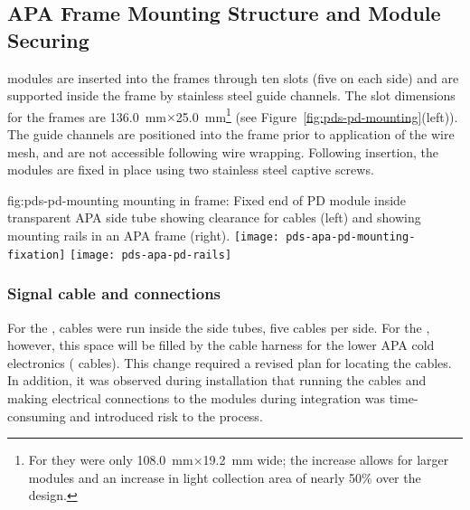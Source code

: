 \subsection{APA Frame Mounting Structure and Module Securing}	
\label{sec:fdsp-pd-assy-frames}

 modules are inserted into the  frames through ten slots (five on each side) and are supported inside the frame by stainless steel guide channels.  The slot dimensions for the   frames 
are \SI{136.0}{mm}$\times$\SI{25.0}{mm}\footnote{For  they were only \SI{108.0}{mm}$\times$\SI{19.2}{mm} wide; the increase allows for larger  modules and an increase in light collection area of nearly 50\% over the  design.}   
(see Figure~\ref{fig:pds-pd-mounting}(left)).
The guide channels are positioned into the  frame prior to application of the wire %
mesh, %
and are not accessible following wire wrapping. Following insertion, the  modules are fixed in place using two stainless steel captive screws.

 

\begin{dunefigure}{fig:pds-pd-mounting}
{ mounting in  frame: Fixed end of PD module inside transparent APA side tube showing clearance for  cables (left) and showing  mounting rails in an APA frame  (right).}
	\texttt{[image: pds-apa-pd-mounting-fixation]}
	\texttt{[image: pds-apa-pd-rails]}
\end{dunefigure}

\subsubsection{Signal cable and connections}

For the ,  cables were run inside the  side tubes, five cables per side.  For the , however, this space will be filled by the cable harness for the lower APA cold electronics ( cables).  This change required a revised plan for locating the  cables.  In addition, it was observed during   installation that running the  cables and making electrical connections to the modules during  integration was time-consuming and introduced risk to the process.

